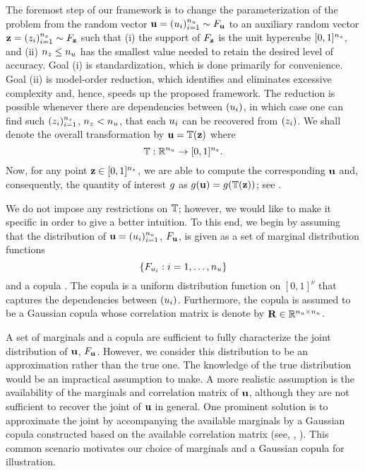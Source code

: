 The foremost step of our framework is to change the parameterization of the
problem from the random vector $\mathbf{u} = (u_i)_{i = 1}^{n_u} \sim F_{\mathbf{u}}$
to an auxiliary random vector $\mathbf{z} = (z_i)_{i = 1}^{n_z} \sim F_{\mathbf{z}}$
such that (i) the support of $F_{\mathbf{z}}$ is the unit hypercube $[0,
1]^{n_z}$, and (ii) ${n_z} \leq {n_u}$ has the smallest value needed to retain the
desired level of accuracy. Goal (i) is standardization, which is done primarily
for convenience. Goal (ii) is model-order reduction, which identifies and
eliminates excessive complexity and, hence, speeds up the proposed framework.
The reduction is possible whenever there are dependencies between $(u_i)$, in
which case one can find such $(z_i)_{i = 1}^{n_z}$, ${n_z} < {n_u}$, that each $u_i$
can be recovered from $(z_i)$. We shall denote the overall transformation by
$\mathbf{u} = \mathbb{T}(\mathbf{z})$ where
\begin{equation} \elab{transformation}
  \transformation: \real^\nu \to [0, 1]^\nz.
\end{equation}
Now, for any point $\mathbf{z} \in [0, 1]^{n_z}$, we are able to compute the
corresponding $\mathbf{u}$ and, consequently, the quantity of interest $g$ as $g(\mathbf{u})
= g(\mathbb{T}(\mathbf{z}))$; see .

We do not impose any restrictions on $\mathbb{T}$; however, we would like
to make it specific in order to give a better intuition. To this end, we begin
by assuming that the distribution of $\mathbf{u} = (u_i)_{i = 1}^{n_u}$,
$F_{\mathbf{u}}$, is given as a set of marginal distribution functions
\[
  \{ F_{u_i}: i = 1, \dots, {n_u} \}
\]
and a copula \cite{nelsen2006}. The copula is a uniform distribution function on
$[0, 1]^\nu$ that captures the dependencies between $(u_i)$. Furthermore, the
copula is assumed to be a Gaussian copula whose correlation matrix is denote by
$\mathbf{R} \in \mathbb{R}^{{n_u} \times {n_u}}$.

\begin{remark}
A set of marginals and a copula are sufficient to fully characterize the joint
distribution of $\mathbf{u}$, $F_{\mathbf{u}}$. However, we consider this
distribution to be an approximation rather than the true one. The knowledge of
the true distribution would be an impractical assumption to make. A more
realistic assumption is the availability of the marginals and correlation matrix
of $\mathbf{u}$, although they are not sufficient to recover the joint of $\mathbf{u}$ in
general. One prominent solution is to approximate the joint by accompanying the
available marginals by a Gaussian copula constructed based on the available
correlation matrix (see, \eg, \cite{ukhov2014}). This common scenario motivates
our choice of marginals and a Gaussian copula for illustration.
\end{remark}

